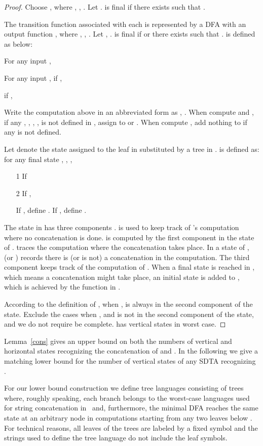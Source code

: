 \documentclass[copyright]{eptcs}
\begin{document}
\begin{proof}
Choose ,
where , , . Let .  is final if there exists
 such that .

The transition function  associated with each  is
represented by a DFA  with an output
function , where , ,
. Let , .  is final if  or there exists
 such that .  is
defined as below:

For any input ,

For any input , if ,


if ,


Write the computation above in an abbreviated form as , . When compute  and , if any
, , , , is not defined in , assign  to
 or . When compute , add nothing to  if any
 is not defined.

Let  denote the state assigned to the leaf in
 substituted by a tree in .  is
defined as: for any final state ,
, ,
\begin{itemize}
  \item[1] If 

\item[2] If ,

If , define . If
, define .
\end{itemize}
The state in  has three components .  is
used to keep track of 's computation where no concatenation
is done.  is computed by the first component  in the
state of .  traces the computation where the
concatenation takes place. In a state 
of ,  (or ) records there is (or is not)
a concatenation in the computation. The third component  keeps
track of the computation of . When a final state is reached
in , which means a concatenation might take place, an initial
state  is added to , which is achieved by the
 function in .

According to the definition of , when
,  is always in the
second component of the state. Exclude the cases when
, and  is not in the
second component of the state, and we do not require  be
complete.  has  vertical states in worst case.
\end{proof}
\endpf

Lemma~\ref{cons} gives an upper bound on both the numbers of
vertical and horizontal states recognizing the concatenation of
 and . In the following we give a matching lower
bound for the number of vertical states of any SDTA recognizing
.




For our lower bound construction we define tree languages
consisting of trees where, roughly speaking, each branch
belongs to the worst-case languages used for string concatenation
in~\cite{YuZhSa94} and, furthermore, the minimal DFA
reaches the same state at an arbitrary node  in computations starting
from any two leaves below . For technical reasons, all leaves
of the trees are labeled by a fixed symbol and the strings used to
define the tree language do not include the leaf symbols.
\end{document}
